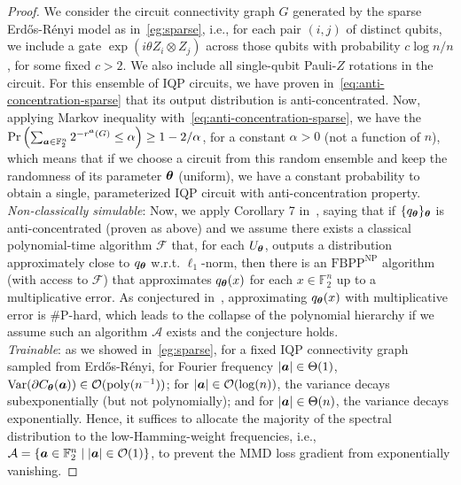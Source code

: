 \documentclass{article}
\theoremstyle{plain}
\theoremstyle{definition}
\theoremstyle{remark}
\begin{document}
\begin{proof}
    We consider the circuit connectivity graph $G$ generated by the sparse Erd\H os-R\'enyi model as in~\cref{eg:sparse}, i.e., for each pair $(i, j)$ of distinct qubits, we include a gate $\exp({i\theta Z_i\otimes Z_j})$ across those qubits with probability $c\log n/n$, for some fixed $c>2$. We also include all single-qubit Pauli-$Z$ rotations in the circuit. For this ensemble of IQP circuits, we have proven in~\cref{eq:anti-concentration-sparse} that its output distribution is anti-concentrated. Now, applying Markov inequality with~\cref{eq:anti-concentration-sparse}, we have the $\Pr\left(\sum_{{\bm{a}} \in \mathbb{F}_2^n}  2^{-r^{\bm{a}}(G)} \le \alpha\right) \ge 1 - 2/\alpha$, for a constant $\alpha >0$ (not a function of $n$), which means that if we choose a circuit from this random ensemble and keep the randomness of its parameter ${\bm{\theta}}$ (uniform), we have a constant probability to obtain a single, parameterized IQP circuit with anti-concentration property.  \\
    \emph{Non-classically simulable}: Now, we apply Corollary 7 in~\cite{Bremner17}, saying that if $\{q_{\bm{\theta}}\}_{\bm{\theta}}$ is anti-concentrated (proven as above) and we assume there exists a classical polynomial-time algorithm $\mathcal{F}$ that, for each $U_{\bm{\theta}}$, outputs a distribution approximately close to $q_{\bm{\theta}}$ w.r.t. $\ell_1$-norm, then there is an $\text{FBPP}^{\text{NP}}$ algorithm (with access to $\mathcal{F}$) that approximates $q_{\bm{\theta}}(x)$ for each $x\in\mathbb{F}_2^n$ up to a multiplicative error. As conjectured in~\cite{Bremner17}, approximating $q_{\bm{\theta}}(x)$ with multiplicative error is \#P-hard, which leads to the collapse of the polynomial hierarchy if we assume such an algorithm $\mathcal{A}$ exists and the conjecture holds.\\
    \emph{Trainable}: as we showed in~\cref{eg:sparse}, for a fixed IQP connectivity graph sampled from Erd\H{o}s-R\'enyi, for Fourier frequency $|{\bm{a}}|\in \Theta(1)$, $\operatorname{Var}(\partial C_{\bm{\theta}}({\bm{a}})) \in \mathcal{O}(\mathrm{poly}(n^{-1}))$; for $|{\bm{a}}|\in \mathcal{O}(\log(n))$, the variance decays subexponentially (but not polynomially); and for $|{\bm{a}}|\in \Theta(n)$, the variance decays exponentially. Hence, it suffices to allocate the majority of the spectral distribution to the low-Hamming-weight frequencies, i.e., $\mathcal{A}=\{{\bm{a}}\in\mathbb{F}_2^n \;\vert\; |{\bm{a}}|\in \mathcal{O}(1)\}$, to prevent the MMD loss gradient from exponentially vanishing.
\end{proof}
\end{document}
